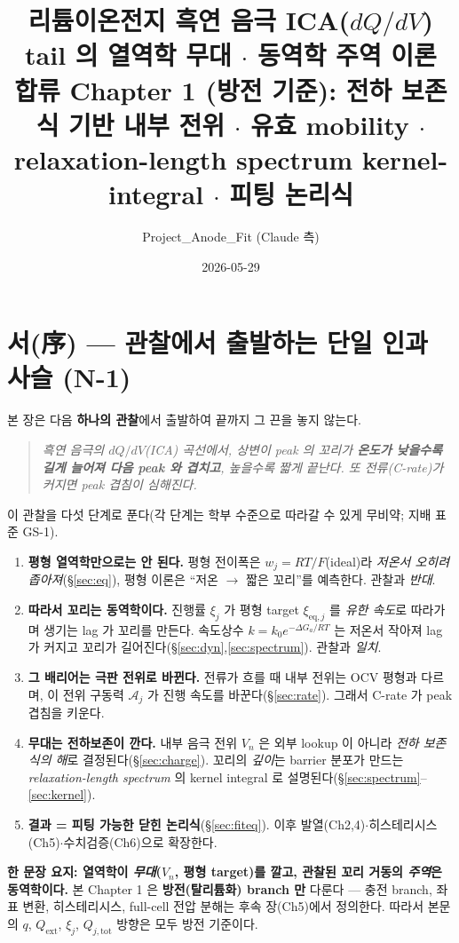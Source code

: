 \documentclass[11pt,a4paper]{article}
\title{\textbf{리튬이온전지 흑연 음극 ICA($dQ/dV$) tail 의 열역학 무대 $\cdot$ 동역학 주역 이론}\\[0.4em]
\large 합류 Chapter 1 (방전 기준): 전하 보존식 기반 내부 전위 $\cdot$ 유효 mobility $\cdot$\\
relaxation-length spectrum kernel-integral $\cdot$ 피팅 논리식}
\author{Project\_Anode\_Fit (Claude 측)}
\date{2026-05-29}
\newcommand{\eq}{\mathrm{eq}}
\newcommand{\tot}{\mathrm{tot}}
\newcommand{\ext}{\mathrm{ext}}
\begin{document}
\maketitle

\section*{서(序) — 관찰에서 출발하는 단일 인과 사슬 (N-1)}
본 장은 다음 \textbf{하나의 관찰}에서 출발하여 끝까지 그 끈을 놓지 않는다.
\begin{quote}\itshape
흑연 음극의 $dQ/dV$(ICA) 곡선에서, 상변이 peak 의 꼬리가 \textbf{온도가 낮을수록 길게 늘어져 다음
peak 와 겹치고}, 높을수록 짧게 끝난다. 또 전류(C-rate)가 커지면 peak 겹침이 심해진다.
\end{quote}
이 관찰을 다섯 단계로 푼다(각 단계는 학부 수준으로 따라갈 수 있게 무비약; 지배 표준 GS-1).
\begin{enumerate}[label=(\arabic*),leftmargin=2.0em]
\item \textbf{평형 열역학만으로는 안 된다.} 평형 전이폭은 $w_j=RT/F$(ideal)라 \emph{저온서 오히려
  좁아져}(\S\ref{sec:eq}), 평형 이론은 ``저온 $\to$ 짧은 꼬리''를 예측한다. 관찰과 \emph{반대}.
\item \textbf{따라서 꼬리는 동역학이다.} 진행률 $\xi_j$ 가 평형 target $\xi_{\eq,j}$ 를 \emph{유한
  속도}로 따라가며 생기는 lag 가 꼬리를 만든다. 속도상수 $k=k_0e^{-\Delta G_a/RT}$ 는 저온서 작아져
  lag 가 커지고 꼬리가 길어진다(\S\ref{sec:dyn},\ref{sec:spectrum}). 관찰과 \emph{일치}.
\item \textbf{그 배리어는 극판 전위로 바뀐다.} 전류가 흐를 때 내부 전위는 OCV 평형과 다르며, 이
  전위 구동력 $\mathcal A_j$ 가 진행 속도를 바꾼다(\S\ref{sec:rate}). 그래서 C-rate 가 peak 겹침을 키운다.
\item \textbf{무대는 전하보존이 깐다.} 내부 음극 전위 $V_n$ 은 외부 lookup 이 아니라 \emph{전하 보존식의
  해}로 결정된다(\S\ref{sec:charge}). 꼬리의 \emph{깊이}는 barrier 분포가 만드는 \emph{relaxation-length
  spectrum} 의 kernel integral 로 설명된다(\S\ref{sec:spectrum}--\ref{sec:kernel}).
\item \textbf{결과 = 피팅 가능한 닫힌 논리식}(\S\ref{sec:fiteq}). 이후 발열(Ch2,4)$\cdot$히스테리시스
  (Ch5)$\cdot$수치검증(Ch6)으로 확장한다.
\end{enumerate}
\noindent\textbf{한 문장 요지: 열역학이 \emph{무대}($V_n$, 평형 target)를 깔고, 관찰된 꼬리 거동의
\emph{주역}은 동역학이다.} 본 Chapter 1 은 \textbf{방전(탈리튬화) branch 만} 다룬다 — 충전 branch,
좌표 변환, 히스테리시스, full-cell 전압 분해는 후속 장(Ch5)에서 정의한다. 따라서 본문의 $q$,
$Q_\ext$, $\xi_j$, $Q_{j,\tot}$ 방향은 모두 방전 기준이다.
\end{document}
